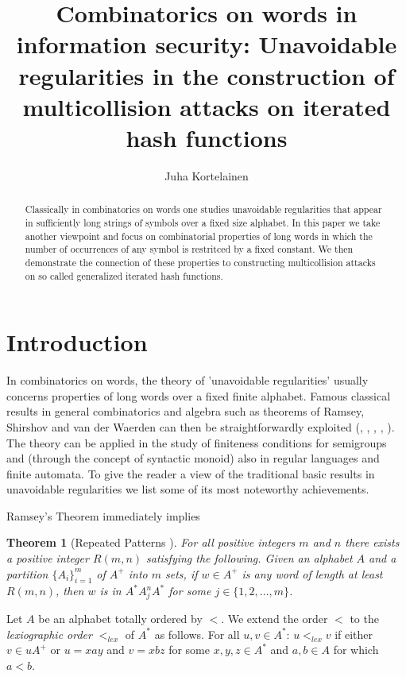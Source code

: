 \documentclass[submission,copyright,creativecommons]{eptcs}
\title{Combinatorics on words in information security: Unavoidable regularities
 in the construction of multicollision attacks on iterated hash functions}
\author{Juha Kortelainen
\institute{Department of Information Processing Science, University of Oulu, Finland}
\email{jkortela@tols16.oulu.fi}}
\newtheorem{theorem}{Theorem}
\begin{document}
\maketitle

\begin{abstract}
Classically in combinatorics on words one studies unavoidable regularities that appear in sufficiently 
long strings of symbols over a fixed size alphabet. In this paper we take another viewpoint and focus on 
combinatorial properties of long words in which the number of occurrences of any symbol is restritced by 
a fixed constant. We then demonstrate the connection  of these properties to constructing multicollision
attacks on so called generalized iterated hash functions.
\end{abstract}


\section{Introduction}

In combinatorics on words, the theory of 'unavoidable regularities' usually concerns properties of long words over a fixed finite alphabet. Famous classical results in general combinatorics and algebra such as theorems of Ramsey, Shirshov and van der Waerden can then be straightforwardly exploited (\cite{Har}, \cite{dLV}, \cite{Res}, \cite{RR1}, \cite{RR2}). The theory can be applied in the study of finiteness conditions for semigroups and (through the concept of syntactic monoid) also in regular languages and finite automata. 
To give the reader a view of the traditional basic results in unavoidable regularities we list some of its most noteworthy achievements.

Ramsey's Theorem immediately implies 

\begin{theorem}[Repeated Patterns \cite{Har}] For all positive integers $m$ and $n$ there exists a positive integer $R(m,n)$ satisfying the following. Given an alphabet $A$ and a partition $\{A_i\}_{i=1}^m$ of $A^+$ into $m$ sets, if $w\in A^+$ is any word of length at least $R(m,n)$, then $w$ is in $A^\ast A_j^nA^\ast$ for some $j\in\{1,2,\ldots,m\}$.
\end{theorem}

Let $A$ be an alphabet totally ordered by $<$. We extend the order $<$ to the \textit{lexiographic order} $<_{lex}$ of $A^\ast$ as follows. For all $u,v\in A^\ast$: $u<_{lex} v$ if either $v\in uA^+$ or $u=xay$ and $v=xbz$ for some $x,y,z\in A^\ast$ and $a,b\in A$ for which $a<b$.
\end{document}
